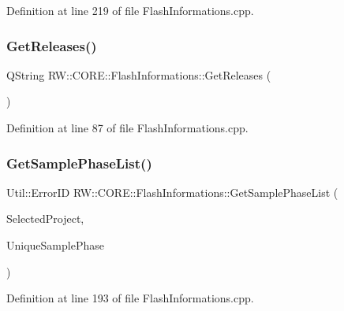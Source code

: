 Definition at line 219 of file Flash\+Informations.\+cpp.

\hypertarget{class_r_w_1_1_c_o_r_e_1_1_flash_informations_a3821e59e8bab2cbef251fc05fa070811}{}\label{class_r_w_1_1_c_o_r_e_1_1_flash_informations_a3821e59e8bab2cbef251fc05fa070811} 
\subsubsection{\texorpdfstring{Get\+Releases()}{GetReleases()}}
{\footnotesize\ttfamily Q\+String R\+W\+::\+C\+O\+R\+E\+::\+Flash\+Informations\+::\+Get\+Releases (\begin{DoxyParamCaption}{ }\end{DoxyParamCaption})\hspace{0.3cm}{\ttfamily [private]}}



Definition at line 87 of file Flash\+Informations.\+cpp.

\hypertarget{class_r_w_1_1_c_o_r_e_1_1_flash_informations_a0be370348f9ae51c37d7af7d4a6a660d}{}\label{class_r_w_1_1_c_o_r_e_1_1_flash_informations_a0be370348f9ae51c37d7af7d4a6a660d} 
\subsubsection{\texorpdfstring{Get\+Sample\+Phase\+List()}{GetSamplePhaseList()}}
{\footnotesize\ttfamily Util\+::\+Error\+ID R\+W\+::\+C\+O\+R\+E\+::\+Flash\+Informations\+::\+Get\+Sample\+Phase\+List (\begin{DoxyParamCaption}\item[{Q\+String}]{Selected\+Project,  }\item[{Q\+List$<$ Q\+String $>$ \&}]{Unique\+Sample\+Phase }\end{DoxyParamCaption})}



Definition at line 193 of file Flash\+Informations.\+cpp.


